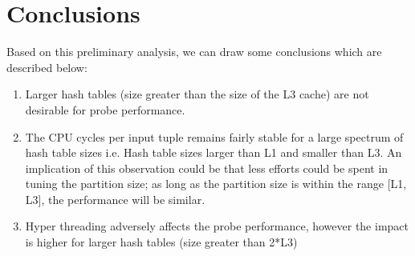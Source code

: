 \section{Conclusions}
Based on this preliminary analysis, we can draw some conclusions which are described below:%
\begin{enumerate}
	\item{Larger hash tables (size greater than the size of the L3 cache) are not desirable for probe performance.}
	\item{The CPU cycles per input tuple remains fairly stable for a large spectrum of hash table sizes i.e. Hash table sizes larger than L1 and smaller than L3. An implication of this observation could be that less efforts could be spent in tuning the partition size; as long as the partition size is within the range [L1, L3], the performance will be similar. }
	\item{Hyper threading adversely affects the probe performance, however the impact is higher for larger hash tables (size greater than 2*L3)}
\end{enumerate}
